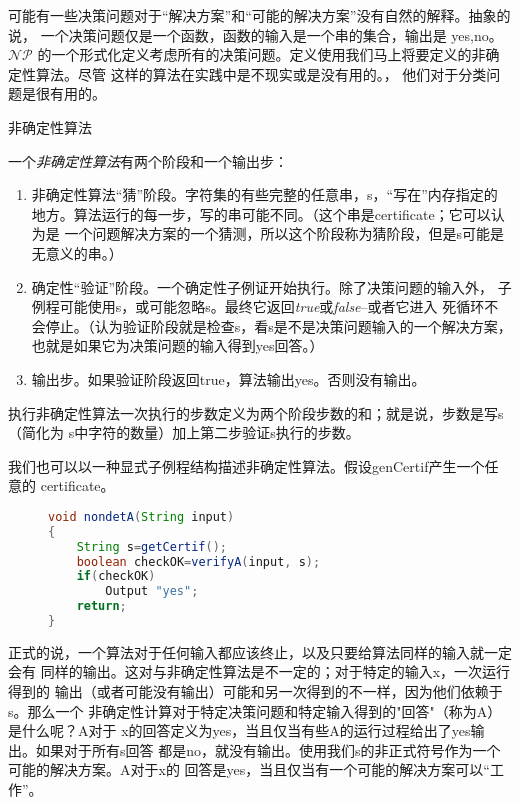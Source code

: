 可能有一些决策问题对于“解决方案”和“可能的解决方案”没有自然的解释。抽象的说，
一个决策问题仅是一个函数，函数的输入是一个串的集合，输出是 {yes,no}。$\mathcal{NP}$
的一个形式化定义考虑所有的决策问题。定义使用我们马上将要定义的非确定性算法。尽管
这样的算法在实践中是不现实或是没有用的。， 他们对于分类问题是很有用的。

\begin{definition}
非确定性算法

一个\emph{非确定性算法}有两个阶段和一个输出步：
\begin{enumerate}
\item 非确定性算法“猜”阶段。字符集的有些完整的任意串，s，“写在”内存指定的
    地方。算法运行的每一步，写的串可能不同。（这个串是certificate；它可以认为是
    一个问题解决方案的一个猜测，所以这个阶段称为猜阶段，但是s可能是无意义的串。）
\item 确定性“验证”阶段。一个确定性子例证开始执行。除了决策问题的输入外，
    子例程可能使用s，或可能忽略s。最终它返回\emph{true}或\emph{false}--或者它进入
    死循环不会停止。（认为验证阶段就是检查s，看s是不是决策问题输入的一个解决方案，
    也就是如果它为决策问题的输入得到yes回答。）
\item 输出步。如果验证阶段返回true，算法输出yes。否则没有输出。
\end{enumerate}
\end{definition}

执行非确定性算法一次执行的步数定义为两个阶段步数的和；就是说，步数是写s（简化为
s中字符的数量）加上第二步验证s执行的步数。

我们也可以以一种显式子例程结构描述非确定性算法。假设genCertif产生一个任意的
certificate。
\begin{figure}
\begin{lstlisting}[language={Java},keywordstyle=\color{blue!70}, commentstyle=\color{red!50!green!50!blue!50}]
void nondetA(String input)
{
    String s=getCertif();
    boolean checkOK=verifyA(input, s);
    if(checkOK)
        Output "yes";
    return;
}
\end{lstlisting}
\end{figure}
正式的说，一个算法对于任何输入都应该终止，以及只要给算法同样的输入就一定会有
同样的输出。这对与非确定性算法是不一定的；对于特定的输入x，一次运行 得到的
输出（或者可能没有输出）可能和另一次得到的不一样，因为他们依赖于s。那么一个
非确定性计算对于特定决策问题和特定输入得到的"回答"（称为A）是什么呢？A对于
x的回答定义为yes，当且仅当有些A的运行过程给出了yes输出。如果对于所有s回答
都是no，就没有输出。使用我们s的非正式符号作为一个可能的解决方案。A对于x的
回答是yes，当且仅当有一个可能的解决方案可以“工作”。

